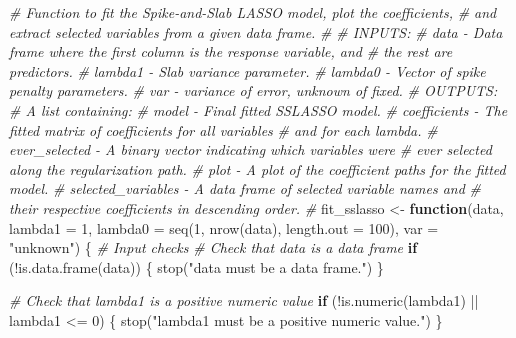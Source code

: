 \documentclass[
  11pt,
]{article}
\newenvironment{Shaded}{}{}
\newcommand{\AttributeTok}[1]{\textcolor[rgb]{0.49,0.56,0.16}{#1}}
\newcommand{\CommentTok}[1]{\textcolor[rgb]{0.38,0.63,0.69}{\textit{#1}}}
\newcommand{\ControlFlowTok}[1]{\textcolor[rgb]{0.00,0.44,0.13}{\textbf{#1}}}
\newcommand{\DecValTok}[1]{\textcolor[rgb]{0.25,0.63,0.44}{#1}}
\newcommand{\FunctionTok}[1]{\textcolor[rgb]{0.02,0.16,0.49}{#1}}
\newcommand{\NormalTok}[1]{#1}
\newcommand{\OtherTok}[1]{\textcolor[rgb]{0.00,0.44,0.13}{#1}}
\newcommand{\SpecialCharTok}[1]{\textcolor[rgb]{0.25,0.44,0.63}{#1}}
\newcommand{\StringTok}[1]{\textcolor[rgb]{0.25,0.44,0.63}{#1}}
\begin{document}
\begin{Shaded}
\begin{Highlighting}[]
\CommentTok{\# Function to fit the Spike{-}and{-}Slab LASSO model, plot the coefficients,}
\CommentTok{\#   and extract selected variables from a given data frame.}
\CommentTok{\#}
\CommentTok{\# INPUTS:}
\CommentTok{\#     data {-} Data frame where the first column is the response variable, and }
\CommentTok{\#             the rest are predictors.}
\CommentTok{\#     lambda1 {-} Slab variance parameter.}
\CommentTok{\#     lambda0 {-} Vector of spike penalty parameters.}
\CommentTok{\#     var {-} variance of error, unknown of fixed.}
\CommentTok{\# OUTPUTS:}
\CommentTok{\#     A list containing:}
\CommentTok{\#         model {-} Final fitted SSLASSO model.}
\CommentTok{\#         coefficients {-} The fitted matrix of coefficients for all variables }
\CommentTok{\#                           and for each lambda.}
\CommentTok{\#         ever\_selected {-} A binary vector indicating which variables were}
\CommentTok{\#                        ever selected along the regularization path.}
\CommentTok{\#         plot {-} A plot of the coefficient paths for the fitted model.}
\CommentTok{\#         selected\_variables {-} A data frame of selected variable names and}
\CommentTok{\#               their respective coefficients in descending order.}
\CommentTok{\#}
\NormalTok{fit\_sslasso }\OtherTok{\textless{}{-}} \ControlFlowTok{function}\NormalTok{(data, }\AttributeTok{lambda1 =} \DecValTok{1}\NormalTok{, }
                        \AttributeTok{lambda0 =} \FunctionTok{seq}\NormalTok{(}\DecValTok{1}\NormalTok{, }\FunctionTok{nrow}\NormalTok{(data), }\AttributeTok{length.out =} \DecValTok{100}\NormalTok{), }
                        \AttributeTok{var =} \StringTok{"unknown"}\NormalTok{) \{}
  \CommentTok{\# Input checks}
  \CommentTok{\# Check that \textquotesingle{}data\textquotesingle{} is a data frame}
  \ControlFlowTok{if}\NormalTok{ (}\SpecialCharTok{!}\FunctionTok{is.data.frame}\NormalTok{(data)) \{}
    \FunctionTok{stop}\NormalTok{(}\StringTok{"\textquotesingle{}data\textquotesingle{} must be a data frame."}\NormalTok{)}
\NormalTok{  \}}
  
  \CommentTok{\# Check that \textquotesingle{}lambda1\textquotesingle{} is a positive numeric value}
  \ControlFlowTok{if}\NormalTok{ (}\SpecialCharTok{!}\FunctionTok{is.numeric}\NormalTok{(lambda1) }\SpecialCharTok{||}\NormalTok{ lambda1 }\SpecialCharTok{\textless{}=} \DecValTok{0}\NormalTok{) \{}
    \FunctionTok{stop}\NormalTok{(}\StringTok{"\textquotesingle{}lambda1\textquotesingle{} must be a positive numeric value."}\NormalTok{)}
\NormalTok{  \}}
  

\end{Highlighting}
\end{Shaded}
\end{document}
